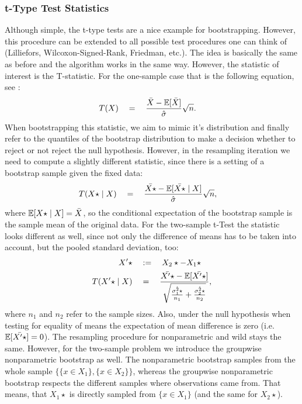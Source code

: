 	\subsubsection*{t-Type Test Statistics}
Although simple, the t-type tests are a nice example for bootstrapping. However, this procedure can be extended to all possible test procedures one can think of (Lilliefors, Wilcoxon-Signed-Rank, Friedman, etc.). The idea is basically the same as before and the algorithm works in the same way. However, the statistic of interest is the T-statistic. For the one-sample case that is the following equation, see \citet{t}:
\begin{align*}
	T(X) \quad &= \quad \frac{\bar{X} - \mathbb{E}[\bar{X}]}{\hat{\sigma}}\sqrt{n}.
\end{align*}
When bootstrapping this statistic, we aim to mimic it's distribution and finally refer to the quantiles of the bootstrap distribution to make a decision whether to reject or not reject the null hypothesis. However, in the resampling iteration we need to compute a slightly different statistic, since there is a setting of a bootstrap sample given the fixed data:
\begin{align*}
	T(X\star \mid X) \quad &= \quad \frac{\bar{X\star} - \mathbb{E}[\bar{X\star} \mid X]}{\hat{\sigma}}\sqrt{n},
\end{align*}
where $\mathbb{E}[X\star \mid X] = \bar{X}$, so the conditional expectation of the bootstrap sample is the sample mean of the original data. For the two-sample t-Test the statistic looks different as well, since not only the difference of means has to be taken into account, but the pooled standard deviation, too:
\begin{align*}
	X'\star \quad &:= \quad X_2\star - X_1\star \\
	T(X'\star \mid X) \quad &= \quad \frac{\bar{X'\star} - \mathbb{E}[\bar{X'\star}]}{\sqrt{\frac{\hat{\sigma_1^2\star}}{n_1} + \frac{\hat{\sigma_2^2\star}}{n_2}}},
\end{align*}
where $n_1$ and $n_2$ refer to the sample sizes. Also, under the null hypothesis when testing for equality of means the expectation of mean difference is zero (i.e. $\mathbb{E}[\bar{X'\star}] = 0$). The resampling procedure for nonparametric and wild stays the same. However, for the two-sample problem we introduce the groupwise nonparametric bootstrap as well. The nonparametric bootstrap samples from the whole sample $\{\{x \in X_1\}, \{x \in X_2\}\}$, whereas the groupwise nonparametric bootstrap respects the different samples where observations came from. That means, that $X_1\star$ is directly sampled from $\{x \in X_1\}$ (and the same for $X_2\star$).

